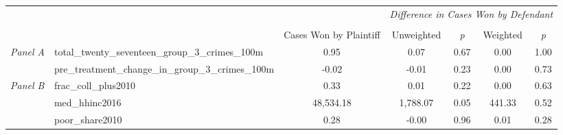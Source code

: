 \begin{tabular}{llccccc}
\toprule
 &  & \textit{} & \multicolumn{4}{c}{\textit{Difference in Cases Won by Defendant}} \\
\cline{4-7}
\\
 &  & Cases Won by Plaintiff & Unweighted & \emph{p} & Weighted & \emph{p} \\
\midrule
\multirow[c]{2}{3cm}{\textit{Panel A}} & total_twenty_seventeen_group_3_crimes_100m & 0.95 & 0.07 & 0.67 & 0.00 & 1.00 \\
 & pre_treatment_change_in_group_3_crimes_100m & -0.02 & -0.01 & 0.23 & 0.00 & 0.73 \\
\cline{1-7}
\multirow[c]{3}{3cm}{\textit{Panel B}} & frac_coll_plus2010 & 0.33 & 0.01 & 0.22 & 0.00 & 0.63 \\
 & med_hhinc2016 & 48,534.18 & 1,788.07 & 0.05 & 441.33 & 0.52 \\
 & poor_share2010 & 0.28 & -0.00 & 0.96 & 0.01 & 0.28 \\
\cline{1-7}
\bottomrule
\end{tabular}
